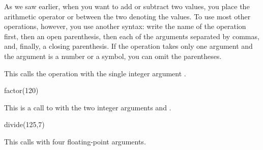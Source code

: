 {{{{{{{{%

As we saw earlier, when you want to add or subtract two values,
you place the arithmetic operator \spadop{+}
or \spadop{-} between the two
 denoting the values.
To use most other \Language{} operations, however, you use another syntax:
write the name
of the operation first, then an open parenthesis, then each of the
arguments separated by commas, and, finally, a closing parenthesis.
If the operation takes only one argument and the argument is a number
or a symbol, you can omit the parentheses.

\begin{xtc}
\begin{xtccomment}
This calls the operation  with the single
integer argument .
\end{xtccomment}
\begin{spadsrc}
factor(120)
\end{spadsrc}
\begin{TeXOutput}
\begin{fricasmath}{1}
%
\end{fricasmath}
\end{TeXOutput}
\end{xtc}
\begin{xtc}
\begin{xtccomment}
This is a call to  with the two integer arguments
 and .
\end{xtccomment}
\begin{spadsrc}
divide(125,7)
\end{spadsrc}
\begin{TeXOutput}
\begin{fricasmath}{2}
%
\end{fricasmath}
\end{TeXOutput}
\end{xtc}
\begin{xtc}
\begin{xtccomment}
This calls  with four floating-point arguments.
\end{xtccomment}
\begin{spadsrc}

\end{spadsrc}
\end{xtc}}}}}}}}}
